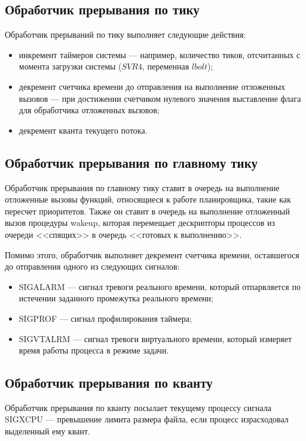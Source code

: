 \subsection{Обработчик прерывания по тику}
Обработчик прерываний по тику выполняет следующие действия:
\begin{itemize}
	\item инкремент таймеров системы --- например, количество тиков, отсчитанных с момента загрузки системы ($SVR4$, переменная $lbolt$);
	\item декремент счетчика времени до отправления на выполнение отложенных вызовов --- при достижении счетчиком нулевого значения выставление флага для обработчика отложенных вызовов; 
	\item декремент кванта текущего потока.
\end{itemize}

\subsection{Обработчик прерывания по главному тику}
Обработчик прерывания по главному тику ставит в очередь на выполнение отложенные вызовы функций, относящиеся к работе планировщика, такие как пересчет приоритетов. Также он ставит в очередь на выполнение отложенный вызов процедуры wakeup, которая перемещает дескрипторы процессов из очереди <<спящих>> в очередь <<готовых к выполнению>>.

Помимо этого, обработчик выполняет декремент счетчика времени, оставшегося до отправления одного из следующих сигналов:
\begin{itemize}
	\item SIGALARM --- сигнал тревоги реального времени, который отпарвляется по истечении заданного промежутка реального времени;
	\item SIGPROF --- сигнал профилирования таймера;
	\item SIGVTALRM --- сигнал тревоги виртуального времени, который измеряет время работы процесса в режиме задачи.
\end{itemize}

\subsection{Обработчик прерывания по кванту}

Обработчик прерывания по кванту посылает текущему процессу сигнала  SIGXCPU --- превышение лимита размера файла, если процесс израсходовал выделенный ему квант. \newline\newline

